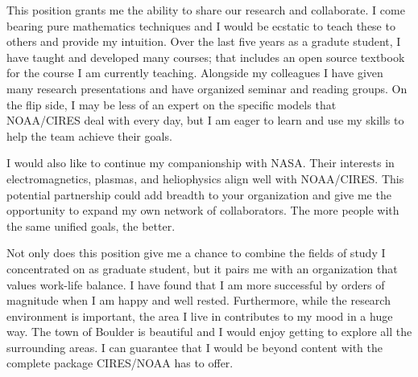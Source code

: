 \documentclass[12pt, letter]{awesome-cv}
\begin{document}
\begin{cvletter}
This position grants me the ability to share our research and collaborate. I come bearing pure mathematics techniques and I would be ecstatic to teach these to others and provide my intuition. Over the last five years as a gradute student, I have taught and developed many courses; that includes an open source textbook for the course I am currently teaching. Alongside my colleagues I have given many research presentations and have organized seminar and reading groups. On the flip side, I may be less of an expert on the specific models that NOAA/CIRES deal with every day, but I am eager to learn and use my skills to help the team achieve their goals. 

I would also like to continue my companionship with NASA. Their interests in electromagnetics, plasmas, and heliophysics align well with NOAA/CIRES. This potential partnership could add breadth to your organization and give me the opportunity to expand my own network of collaborators. The more people with the same unified goals, the better.

Not only does this position give me a chance to combine the fields of study I concentrated on as graduate student, but it pairs me with an organization that values work-life balance. I have found that I am more successful by orders of magnitude when I am happy and well rested. Furthermore, while the research environment is important, the area I live in contributes to my mood in a huge way. The town of Boulder is beautiful and I would enjoy getting to explore all the surrounding areas. I can guarantee that I would be beyond content with the complete package CIRES/NOAA has to offer.






\end{cvletter}

\makeletterclosing
\end{document}
